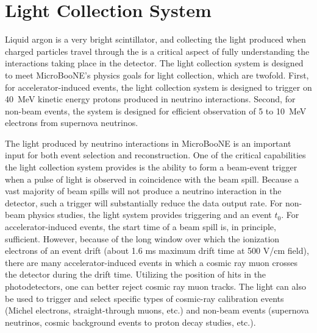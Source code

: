 
%

\section{Light Collection System}
\label{sec:light-collection}

Liquid argon is a very bright scintillator, and collecting the light produced when charged particles travel through the \lartpc is a critical aspect of fully understanding the interactions taking place in the detector.  The light collection system is designed to meet MicroBooNE's physics goals for light collection, which are twofold.
First, for accelerator-induced events, the light collection system is designed to trigger on 40~MeV kinetic energy protons produced in neutrino interactions.  Second, for non-beam events,  the system is designed for efficient observation of 5 to 10~MeV electrons from supernova neutrinos.   

The light produced by neutrino interactions in MicroBooNE is an important input for both event selection and reconstruction.  
One of the critical capabilities the light collection system provides is the ability to form a beam-event trigger when a pulse of light is observed in coincidence with the beam spill.  Because a vast majority of beam spills will not produce a neutrino interaction in the detector, such a trigger will substantially reduce the data output rate.  
For non-beam physics studies, the light system provides triggering and an event $t_0$. For accelerator-induced events, the start time of a beam spill is, in principle, sufficient.  
However, because of the long window over which the ionization electrons of an event drift (about 1.6 ms maximum drift time at 500 V/cm field), there are many accelerator-induced events in which a cosmic ray muon crosses the detector during the drift time.  Utilizing the position of hits in the photodetectors, one can better reject cosmic ray muon tracks.  
The light can also be used to trigger and select specific types of cosmic-ray calibration events (Michel electrons, straight-through muons, etc.) and non-beam events (supernova neutrinos, cosmic background events to proton decay studies, etc.).

